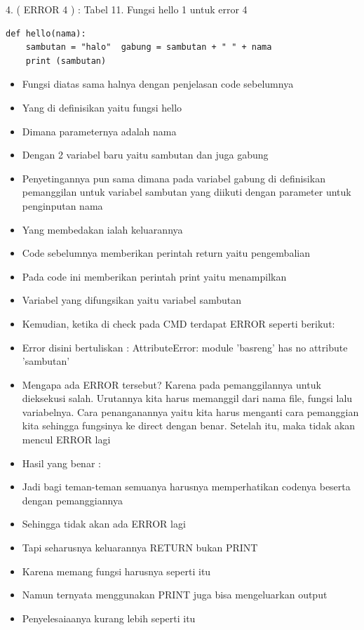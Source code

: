 4. ( ERROR 4 ) : 
Tabel 11. Fungsi hello 1 untuk error 4  
\begin{verbatim}
def hello(nama):
	sambutan = "halo"  gabung = sambutan + " " + nama 
 	print (sambutan) 
\end{verbatim}
\begin{itemize}
\item Fungsi diatas sama halnya dengan penjelasan code sebelumnya 
\item Yang di definisikan yaitu fungsi hello 
\item Dimana parameternya adalah nama 
\item Dengan 2 variabel baru yaitu sambutan dan juga gabung 
\item Penyetingannya pun sama dimana pada variabel gabung di definisikan pemanggilan untuk variabel sambutan yang diikuti dengan parameter untuk penginputan nama 
\item Yang membedakan ialah keluarannya 
\item Code sebelumnya memberikan perintah return yaitu pengembalian 
\item Pada code ini memberikan perintah print yaitu menampilkan 
\item Variabel yang difungsikan yaitu variabel sambutan 
\item Kemudian, ketika di check pada CMD terdapat ERROR seperti berikut: 
\item Error disini bertuliskan : AttributeError: module 'basreng' has no attribute 'sambutan' 
\item Mengapa ada ERROR tersebut? Karena pada pemanggilannya untuk dieksekusi salah. Urutannya kita harus memanggil dari nama file, fungsi lalu variabelnya. Cara penanganannya yaitu kita harus menganti cara pemanggian kita sehingga fungsinya ke direct dengan benar. Setelah itu, maka tidak akan mencul ERROR lagi  
\item Hasil yang benar : 
\item Jadi bagi teman-teman semuanya harusnya memperhatikan codenya beserta dengan pemanggiannya 
\item Sehingga tidak akan ada ERROR lagi 
\item Tapi seharusnya keluarannya RETURN bukan PRINT 
\item Karena memang fungsi harusnya seperti itu 
\item Namun ternyata menggunakan PRINT juga bisa mengeluarkan output 
\item Penyelesaiaanya kurang lebih seperti itu 
\end{itemize}
 
